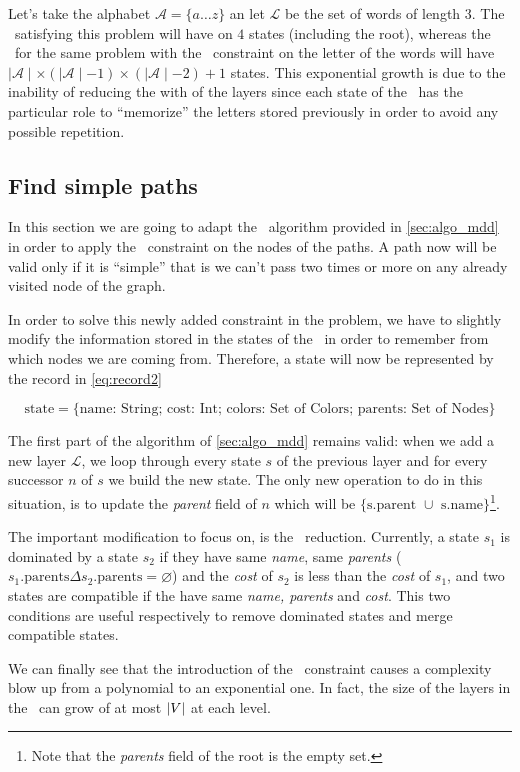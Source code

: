 Let's take the alphabet $\mathcal{A} = \{a \dots z\}$ an let $\mathcal{L}$ be the set of words of length $3$. The \mdd\ satisfying this problem will have on $4$ states (including the root), whereas the \mdd\ for the same problem with the \alldiff\ constraint on the letter of the words will have $\mid \mathcal{A} \mid \times (\mid \mathcal{A} \mid - 1) \times (\mid \mathcal{A} \mid - 2) + 1$ states. This exponential growth is due to the inability of reducing the with of the layers since each state of the \mdd\ has the particular role to ``memorize'' the letters stored previously in order to avoid any possible repetition.

\subsection{Find simple paths}

In this section we are going to adapt the \mdd\ algorithm provided in \cref{sec:algo_mdd} in order to apply the \alldiff\ constraint on the nodes of the paths. A path now will be valid only if it is ``simple'' that is we can't pass two times or more on any already visited node of the graph.

In order to solve this newly added constraint in the problem, we have to slightly modify the information stored in the states of the \mdd\ in order to remember from which nodes we are coming from. Therefore, a state will now be represented by the record in \cref{eq:record2}

\begin{equation}
  \label{eq:record2}
  \text{state} = \{\text{name: String; cost: Int; colors: Set of Colors; parents: Set of Nodes}\}
\end{equation}

The first part of the algorithm of \cref{sec:algo_mdd} remains valid: when we add a new layer $\mathcal{L}$, we loop through every state $s$ of the previous layer and for every successor $n$ of $s$ we build the new state. The only new operation to do in this situation, is to update the \textit{parent} field of $n$ which will be $\{\text{s.parent } \cup \text{ s.name}\}$\footnote{Note that the \textit{parents} field of the root is the empty set.}.

The important modification to focus on, is the \mdd\ reduction. Currently, a state $s_1$ is dominated by a state $s_2$ if they have same \textit{name}, same \textit{parents} (\ie\ $s_1.\text{parents} \Delta s_2.\text{parents} = \varnothing$) and the \textit{cost} of $s_2$ is less than the \textit{cost} of $s_1$, and two states are compatible if the have same \textit{name, parents} and \textit{cost}. This two conditions are useful respectively to remove dominated states and merge compatible states.

We can finally see that the introduction of the \alldiff\ constraint causes a complexity blow up from a polynomial to an exponential one. In fact, the size of the layers in the \mdd\ can grow of at most $|V|$ at each level.


